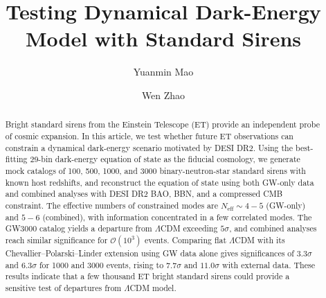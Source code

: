 \documentclass[
  aps,
  prd,
  twocolumn,
  nofootinbib,
  superscriptaddress,
  floatfix,
  longbibliography
]{revtex4-2}
\begin{document}
\title{Testing Dynamical Dark-Energy Model with Standard Sirens}

\author{Yuanmin Mao}

\author{Wen Zhao}


\begin{abstract}
Bright standard sirens from the Einstein Telescope (ET) provide an independent probe of cosmic expansion. In this article, we test whether future ET observations can constrain a dynamical dark-energy scenario motivated by DESI DR2. Using the best-fitting 29-bin dark-energy equation of state as the fiducial cosmology, we generate mock catalogs of 100, 500, 1000, and 3000 binary-neutron-star standard sirens with known host redshifts, and reconstruct the equation of state using both GW-only data and combined analyses with DESI DR2 BAO, BBN, and a compressed CMB constraint. The effective numbers of constrained modes are \(N_{\mathrm{eff}}\sim4-5\) (GW-only) and \(5-6\) (combined), with information concentrated in a few correlated modes. The GW3000 catalog yields a departure from \(\Lambda\)CDM exceeding \(5\sigma\), and combined analyses reach similar significance for \(\mathcal{O}(10^{3})\) events. Comparing flat \(\Lambda\)CDM with its Chevallier--Polarski--Linder extension using GW data alone gives significances of \(3.3\sigma\) and \(6.3\sigma\) for 1000 and 3000 events, rising to \(7.7\sigma\) and \(11.0\sigma\) with external data. These results indicate that a few thousand ET bright standard sirens could provide a sensitive test of departures from \(\Lambda\)CDM model.
\end{abstract}


\maketitle
\end{document}

